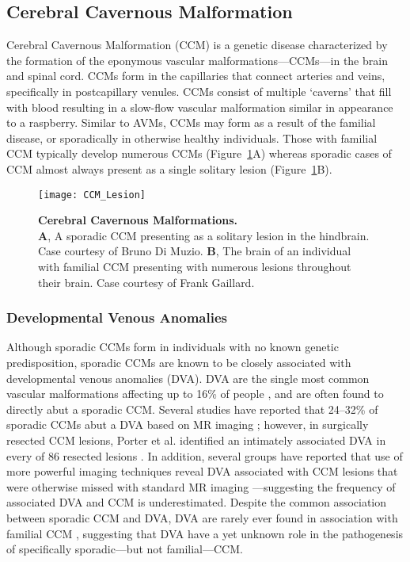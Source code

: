 \subsection{Cerebral Cavernous Malformation}
Cerebral Cavernous Malformation (CCM) is a genetic disease characterized by the formation of the eponymous vascular malformations---CCMs---in the brain and spinal cord. CCMs form in the capillaries that connect arteries and veins, specifically in postcapillary venules. CCMs consist of multiple `caverns' that fill with blood resulting in a slow-flow vascular malformation similar in appearance to a raspberry. Similar to AVMs, CCMs may form as a result of the familial disease, or sporadically in otherwise healthy individuals. Those with familial CCM typically develop numerous CCMs (Figure~\ref{CCM_Lesion}A) whereas sporadic cases of CCM almost always present as a single solitary lesion (Figure~\ref{CCM_Lesion}B). 

\begin{figure}[tbp!]
\begin{center}
\texttt{[image: CCM\_Lesion]}
\end{center}
\caption[Cerebral Cavernous Malformations.] {\textbf{Cerebral Cavernous Malformations.} \\ \textbf{A},  A sporadic CCM presenting as a solitary lesion in the hindbrain. Case courtesy of Bruno Di Muzio. \textbf{B}, The brain of an individual with familial CCM presenting with numerous lesions throughout their brain. Case courtesy of Frank Gaillard.}

\label{CCM_Lesion}
\end{figure}

\subsubsection{Developmental Venous Anomalies}
Although sporadic CCMs form in individuals with no known genetic predisposition, sporadic CCMs are known to be closely associated with developmental venous anomalies (DVA). DVA are the single most common vascular malformations affecting up to 16\% of people \citep{brinjikji2017}, and are often found to directly abut a sporadic CCM. Several studies have reported that 24--32\% of sporadic CCMs abut a DVA based on MR imaging \citep{abdulrauf1999, wurm2005, porter1999}; however, in surgically resected CCM lesions, Porter et al. identified an intimately associated DVA in every of 86 resected lesions \citep{porter1999}. In addition, several groups have reported that use of more powerful imaging techniques reveal DVA associated with CCM lesions that were otherwise missed with standard MR imaging \citep{dammann2017, kamezawa2005}---suggesting the frequency of associated DVA and CCM is underestimated. Despite the common association between sporadic CCM and DVA, DVA are rarely ever found in association with familial CCM \citep{petersen2010}, suggesting that DVA have a yet unknown role in the pathogenesis of specifically sporadic---but not familial---CCM.

